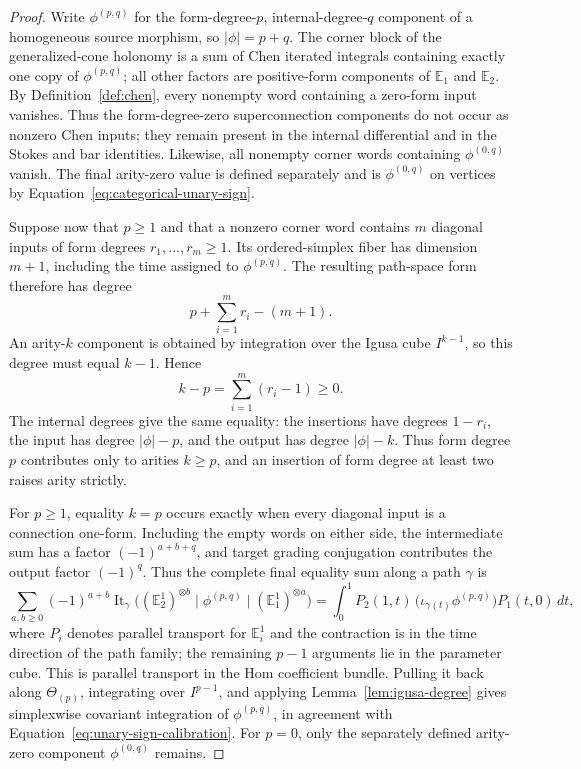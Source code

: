 \documentclass[12pt]{amsart}
\theoremstyle{definition}
\theoremstyle{remark}
\numberwithin{equation}{section}
\newcommand{\1}{{\mathbb{1}}}
\begin{document}
\begin{proof}
Write $\phi^{(p,q)}$ for the form-degree-$p$, internal-degree-$q$
component of a homogeneous source morphism, so $|\phi|=p+q$.  The
corner block of the generalized-cone
holonomy is a sum of Chen iterated integrals containing exactly one
copy of $\phi^{(p,q)}$; all other factors are positive-form
components of $\mathbb E_1$ and $\mathbb E_2$.  By
Definition~\ref{def:chen}, every nonempty word containing a zero-form
input vanishes.  Thus the form-degree-zero superconnection components
do not occur as nonzero Chen inputs; they remain present in the
internal differential and in the Stokes and bar identities.  Likewise,
all nonempty corner words containing $\phi^{(0,q)}$ vanish.  The
final arity-zero value is defined separately and is
$\phi^{(0,q)}$ on vertices by
Equation~\eqref{eq:categorical-unary-sign}.

Suppose now that $p\geq1$ and that a nonzero corner word contains $m$
diagonal inputs of form degrees $r_1,\ldots,r_m\geq1$.  Its
ordered-simplex fiber has dimension $m+1$, including the time assigned
to $\phi^{(p,q)}$.  The resulting path-space form therefore has degree
\[
 p+\sum_{i=1}^m r_i-(m+1).
\]
An arity-$k$ component is obtained by integration over the Igusa cube
$I^{k-1}$, so this degree must equal $k-1$.  Hence
\begin{equation}\label{eq:rh-leading-degree}
 k-p=\sum_{i=1}^m(r_i-1)\geq0.
\end{equation}
The internal degrees give the same equality: the insertions have
degrees $1-r_i$, the input has degree $|\phi|-p$, and the output has
degree $|\phi|-k$.  Thus form degree $p$ contributes only to arities
$k\geq p$, and an insertion of form degree at least two raises arity
strictly.

For $p\geq1$, equality $k=p$ occurs exactly when every diagonal input
is a connection one-form.  Including the empty words on either side,
the intermediate sum has a factor $(-1)^{a+b+q}$, and target grading
conjugation contributes the output factor $(-1)^q$.  Thus the complete
final equality sum along a path $\gamma$ is
\[
 \sum_{a,b\geq0}
 (-1)^{a+b}
 \operatorname{It}_\gamma
 \bigl((\mathbb E_2^1)^{\otimes b}\mid
       \phi^{(p,q)}\mid
       (\mathbb E_1^1)^{\otimes a}\bigr)
 =
 \int_0^1
 P_2(1,t)\,
 \bigl(\iota_{\dot\gamma(t)}\phi^{(p,q)}\bigr)
 P_1(t,0)\,dt,
\]
where $P_i$ denotes parallel transport for $\mathbb E_i^1$ and the
contraction is in the time direction of the path family; the remaining
$p-1$ arguments lie in the parameter cube.  This is parallel
transport in the Hom coefficient bundle.  Pulling it back along
$\Theta_{(p)}$, integrating over $I^{p-1}$, and applying
Lemma~\ref{lem:igusa-degree} gives
simplexwise covariant integration of $\phi^{(p,q)}$, in
agreement with Equation~\eqref{eq:unary-sign-calibration}.  For
$p=0$, only the separately defined arity-zero component
$\phi^{(0,q)}$ remains.


\end{proof}
\end{document}
